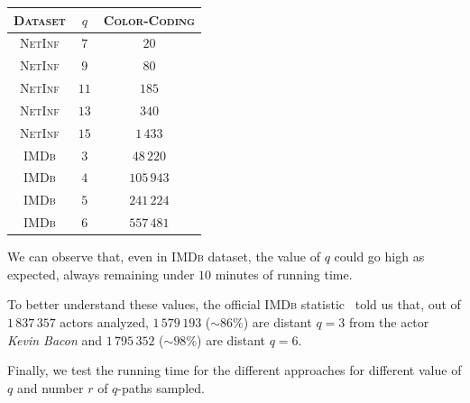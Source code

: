 \begin{table}[ht]
	\centering
	\begin{tabular}{|c|c|c|}
		\hline
		\textsc{Dataset} & $q$  & \textsc{Color-Coding} \\ \hline \hline
		\textsc{NetInf}  & $7$  & $20$                  \\ \hline
		\textsc{NetInf}  & $9$  & $80$                  \\ \hline
		\textsc{NetInf}  & $11$ & $185$                 \\ \hline
		\textsc{NetInf}  & $13$ & $340$                 \\ \hline
		\textsc{NetInf}  & $15$ & $1\,433$              \\ \hline \hline
		\textsc{IMDb}    & $3$  & $48\,220$             \\ \hline
		\textsc{IMDb}    & $4$  & $105\,943$            \\ \hline
		\textsc{IMDb}    & $5$  & $241\,224$            \\ \hline
		\textsc{IMDb}    & $6$  & $557\,481$            \\ \hline
	\end{tabular}
\end{table}

We can observe that, even in \textsc{IMDb} dataset, the value of $q$ could go high as expected, always remaining under $10$ minutes of running time. \medskip

To better understand these values, the official \textsc{IMDb} statistic~\cite{imdbstat} told us that, out of $1\,837\,357$ actors analyzed, $1\,579\,193$ ($\sim86\%$) are distant $q=3$ from the actor \textit{Kevin Bacon} and $1\,795\,352$ ($\sim98\%$) are distant $q=6$.\medskip

Finally, we test the running time for the different approaches for different value of $q$ and number $r$ of $q$-paths sampled. 


